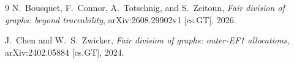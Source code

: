 \documentclass[11pt]{article}
\theoremstyle{remark}
\begin{document}
\begin{thebibliography}{9}
N.~Bousquet, F.~Connor, A.~Totschnig, and S.~Zeitoun, \emph{Fair division of graphs: beyond traceability}, arXiv:2608.29902v1 [cs.GT], 2026.

J.~Chen and W.~S.~Zwicker, \emph{Fair division of graphs: outer-EF1 allocations}, arXiv:2402.05884 [cs.GT], 2024.
\end{thebibliography}
\end{document}
